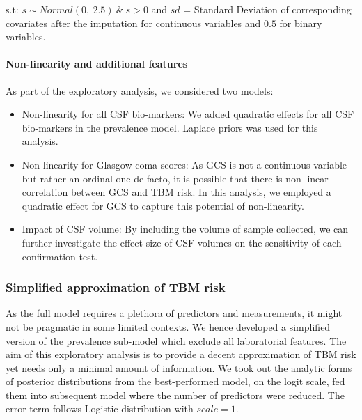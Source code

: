 \documentclass[
]{article}
\providecommand{\tightlist}{%
  \setlength{\itemsep}{0pt}\setlength{\parskip}{0pt}}
\begin{document}
s.t: \(s \sim Normal(0,\ 2.5)\ \&\ s>0\) and \(sd\) = Standard Deviation of corresponding covariates after the imputation for continuous variables and \(0.5\) for binary variables.

\hypertarget{non-linearity-and-additional-features}{%
\paragraph{Non-linearity and additional features}\label{non-linearity-and-additional-features}}

As part of the exploratory analysis, we considered two models:

\begin{itemize}
\item
  Non-linearity for all CSF bio-markers: We added quadratic effects for all CSF bio-markers in the prevalence model. Laplace priors was used for this analysis.
\item
  Non-linearity for Glasgow coma scores: As GCS is not a continuous variable but rather an ordinal one de facto, it is possible that there is non-linear correlation between GCS and TBM risk. In this analysis, we employed a quadratic effect for GCS to capture this potential of non-linearity.
\end{itemize}

\begin{itemize}
\tightlist
\item
  Impact of CSF volume: By including the volume of sample collected, we can further investigate the effect size of CSF volumes on the sensitivity of each confirmation test.
\end{itemize}

\hypertarget{simplified-approximation-of-tbm-risk}{%
\subsubsection{Simplified approximation of TBM risk}\label{simplified-approximation-of-tbm-risk}}

As the full model requires a plethora of predictors and measurements, it might not be pragmatic in some limited contexts. We hence developed a simplified version of the prevalence sub-model which exclude all laboratorial features. The aim of this exploratory analysis is to provide a decent approximation of TBM risk yet needs only a minimal amount of information. We took out the analytic forms of posterior distributions from the best-performed model, on the logit scale, fed them into subsequent model where the number of predictors were reduced. The error term follows Logistic distribution with \(scale = 1\).
\end{document}
